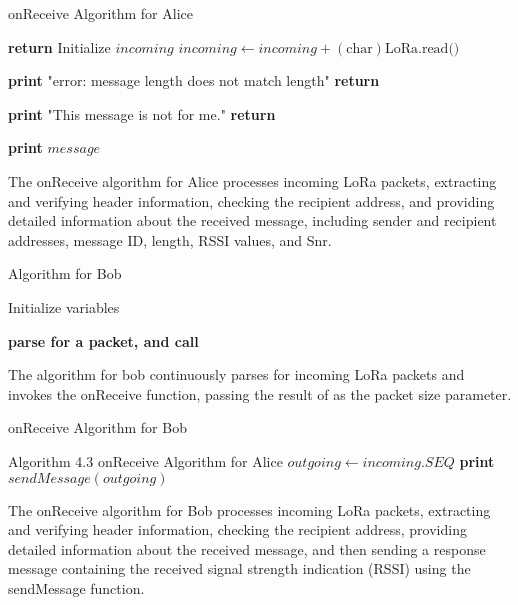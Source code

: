   \begin{algorithm}[hbt!]
    \caption{onReceive Algorithm for Alice}\label{alg:onReceive}
    \begin{algorithmic}
                \State \textbf{return}
            \EndIf
            \State {}
            \State Initialize $incoming$ 
                \State $incoming \gets incoming + (\text{char})\text{LoRa.read()}$
            \EndWhile
            
                \State \textbf{print} "error: message length does not match length"
                \State \textbf{return}
            \EndIf
            
                \State \textbf{print} "This message is not for me."
                \State \textbf{return}
            \EndIf
            
            \State {}
            \State \textbf{print} $message$
        \EndFunction
    \end{algorithmic}
\end{algorithm}
The onReceive algorithm for Alice processes incoming LoRa packets, extracting and verifying header information, checking the recipient address, and providing detailed information about the received message, including sender and recipient addresses, message ID, length, RSSI values, and Snr.
\begin{algorithm}[hbt!]
  \caption{Algorithm for Bob}\label{alg:Bob}
  \begin{algorithmic}
  \State Initialize variables
      
          \State \textbf{parse for a packet, and call} 
      \EndFunction
  \end{algorithmic}
\end{algorithm}
The algorithm for bob continuously parses for incoming LoRa packets and invokes the onReceive function, passing the result of as the packet size parameter.
\begin{algorithm}[hbt!]
  \caption{onReceive Algorithm for Bob}\label{alg:BobonReceive}
  \begin{algorithmic}
          \State Algorithm 4.3 onReceive Algorithm for Alice
          \State $outgoing \gets incoming.SEQ$
          \State \textbf{print} $sendMessage(outgoing)$
      \EndFunction
  \end{algorithmic}
\end{algorithm}
The onReceive algorithm for Bob processes incoming LoRa packets, extracting and verifying header information, checking the recipient address, providing detailed information about the received message, and then sending a response message containing the received signal strength indication (RSSI) using the sendMessage function.

